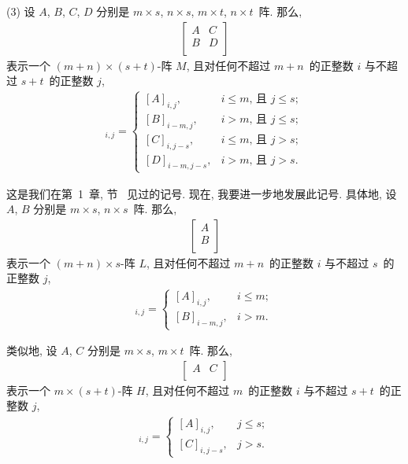 \documentclass[../libro.tex]{subfiles}
\begin{document}
(3)
设 \(A\), \(B\), \(C\), \(D\)
分别是 \(m \times s\), \(n \times s\),
\(m \times t\), \(n \times t\)~阵.
那么,
\begin{align*}
    \begin{bmatrix}
        A & C \\
        B & D \\
    \end{bmatrix}
\end{align*}
表示一个 \((m + n) \times (s + t)\)-阵 \(M\),
且对任何不超过 \(m + n\)~的正整数 \(i\)
与不超过 \(s + t\)~的正整数 \(j\),
\begin{align*}
    [M]_{i,j} =
    \begin{cases}
        [A]_{i,j},
        & \text{\(i \leq m\), 且 \(j \leq s\)}; \\
        [B]_{i-m,j},
        & \text{\(i > m\), 且 \(j \leq s\)};    \\
        [C]_{i,j-s},
        & \text{\(i \leq m\), 且 \(j > s\)};    \\
        [D]_{i-m,j-s},
        & \text{\(i > m\), 且 \(j > s\)}.
    \end{cases}
\end{align*}

这是我们在第~1~章, 节~ 见过的记号.
现在, 我要进一步地发展此记号.
具体地,
设 \(A\), \(B\)
分别是 \(m \times s\), \(n \times s\)~阵.
那么,
\begin{align*}
    \begin{bmatrix}
        A \\
        B \\
    \end{bmatrix}
\end{align*}
表示一个 \((m + n) \times s\)-阵 \(L\),
且对任何不超过 \(m + n\)~的正整数 \(i\)
与不超过 \(s\)~的正整数 \(j\),
\begin{align*}
    [L]_{i,j} =
    \begin{cases}
        [A]_{i,j},
        & \text{\(i \leq m\)}; \\
        [B]_{i-m,j},
        & \text{\(i > m\)}.
    \end{cases}
\end{align*}

类似地, 设 \(A\), \(C\)
分别是 \(m \times s\), \(m \times t\)~阵.
那么,
\begin{align*}
    \begin{bmatrix}
        A & C \\
    \end{bmatrix}
\end{align*}
表示一个 \(m \times (s + t)\)-阵 \(H\),
且对任何不超过 \(m\)~的正整数 \(i\)
与不超过 \(s + t\)~的正整数 \(j\),
\begin{align*}
    [H]_{i,j} =
    \begin{cases}
        [A]_{i,j},
        & \text{\(j \leq s\)}; \\
        [C]_{i,j-s},
        & \text{\(j > s\)}.
    \end{cases}
\end{align*}
\end{document}
